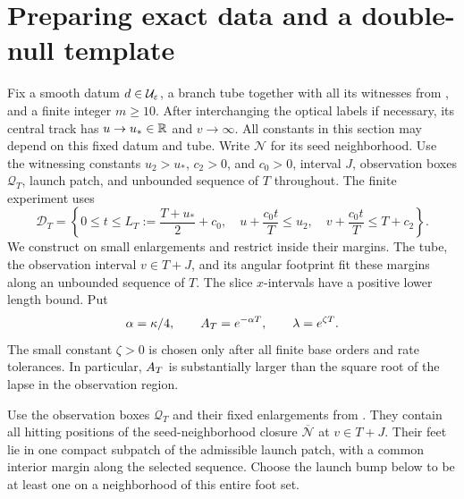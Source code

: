 \section{Preparing exact data and a double-null template}
\label{pk:section}

Fix a smooth datum $d\in\mathcal U_{\varepsilon}$, a branch tube together with all its
witnesses from , and a finite integer $m\ge10$.
After interchanging the optical labels if necessary, its central
track has $u\to u_*\in\mathbb R$ and $v\to\infty$. All constants in this
section may depend on this fixed datum and tube. Write $\mathcal N$ for its seed
neighborhood. Use the witnessing constants $u_2>u_*$, $c_2>0$, and
$c_0>0$, interval $J$, observation boxes $\mathcal Q_T$, launch patch,
and unbounded sequence of $T$ throughout. The finite experiment uses
\begin{equation}\label{pk:domain}
 \mathcal D_T=\left\{0\le t\le L_T:=\frac{T+u_*}{2}+c_0,
 \quad u+\frac{c_0t}{T}\le u_2,
 \quad v+\frac{c_0t}{T}\le T+c_2\right\}.
\end{equation}
We construct on small enlargements and restrict inside their margins.
The tube, the observation interval $v\in T+J$, and its angular
footprint fit these margins along an unbounded sequence of $T$.
The slice $x$-intervals have a positive lower length bound. Put
\begin{equation}\label{pk:scales}
 \alpha=\kappa/4,\qquad A_T=e^{-\alpha T},
 \qquad \lambda=e^{\zeta T}.
\end{equation}
The small constant $\zeta>0$ is chosen only after all finite base
orders and rate tolerances. In particular, $A_T$ is substantially
larger than the square root of the lapse in the observation region.

Use the observation boxes $\mathcal Q_T$ and their fixed enlargements
from . They contain all hitting positions of
the seed-neighborhood closure $\overline{\mathcal N}$ at $v\in T+J$. Their feet lie in
one compact subpatch of the admissible launch patch, with a common
interior margin along the selected sequence. Choose the launch bump
below to be at least one on a neighborhood of this entire foot set.

